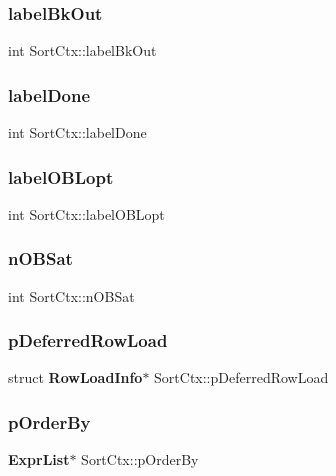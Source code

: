 \subsubsection{labelBkOut}
{\footnotesize\ttfamily int Sort\+Ctx\+::label\+Bk\+Out}

\mbox{\label{struct_sort_ctx_a0f08fc3dd9df4320b3bb74461ca46759}} 
\subsubsection{labelDone}
{\footnotesize\ttfamily int Sort\+Ctx\+::label\+Done}

\mbox{\label{struct_sort_ctx_a4576d27cce98794fea57bf4ae029e8ef}} 
\subsubsection{labelOBLopt}
{\footnotesize\ttfamily int Sort\+Ctx\+::label\+O\+B\+Lopt}

\mbox{\label{struct_sort_ctx_a32e424bbae6b3e56a0959738eaaaf1d2}} 
\subsubsection{nOBSat}
{\footnotesize\ttfamily int Sort\+Ctx\+::n\+O\+B\+Sat}

\mbox{\label{struct_sort_ctx_a1c5e80e8999c8f48a5b9678635ac3b0e}} 
\subsubsection{pDeferredRowLoad}
{\footnotesize\ttfamily struct \textbf{ Row\+Load\+Info}$\ast$ Sort\+Ctx\+::p\+Deferred\+Row\+Load}

\mbox{\label{struct_sort_ctx_a4c1f59510d6e08b38c958c358d31ba07}} 
\subsubsection{pOrderBy}
{\footnotesize\ttfamily \textbf{ Expr\+List}$\ast$ Sort\+Ctx\+::p\+Order\+By}

